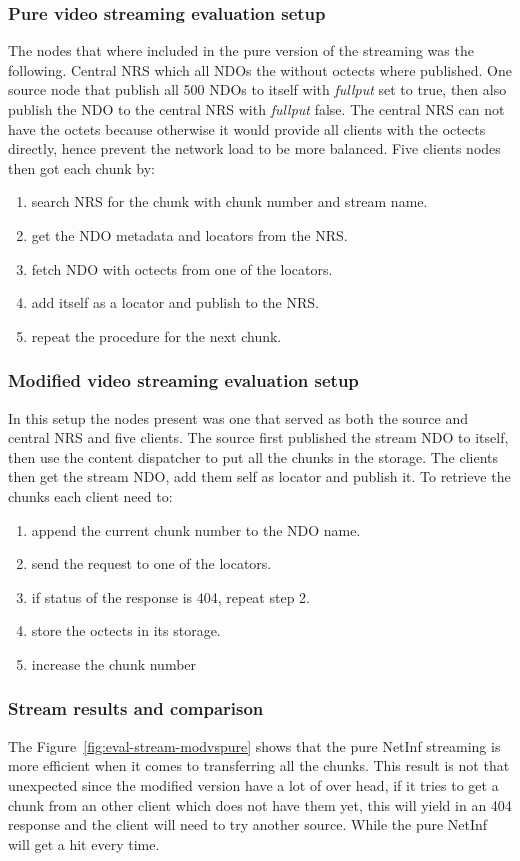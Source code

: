 \subsubsection{Pure video streaming evaluation setup}
The nodes that where included in the pure version of the streaming was the following. 
Central NRS which all NDOs the without octects where published. 
One source node that publish all 500 NDOs to itself with \textit{fullput} set to true, then also publish the NDO to the central NRS with \textit{fullput} false. The central NRS can not have the octets because otherwise it would provide all clients with the octects directly, hence prevent the network load to be more balanced.
Five clients nodes then got each chunk by:
\begin{enumerate}
\item search NRS for the chunk with chunk number and stream name.
\item get the NDO metadata and locators from the NRS.
\item fetch NDO with octects from one of the locators.
\item add itself as a locator and publish to the NRS.
\item repeat the procedure for the next chunk.
\end{enumerate}

\subsubsection{Modified video streaming evaluation setup}
In this setup the nodes present was one that served as both the source and central NRS and five clients. The source first published the stream NDO to itself, then use the content dispatcher to put all the chunks in the storage.
The clients then get the stream NDO, add them self as locator and publish it. To retrieve the chunks each client need to:
\begin{enumerate}
\item append the current chunk number to the NDO name.
\item send the request to one of the locators.
\item if status of the response is 404, repeat step 2.
\item store the octects in its storage.
\item increase the chunk number
\end{enumerate}

\subsubsection{Stream results and comparison} 
The Figure~\ref{fig:eval-stream-modvspure} shows that the pure NetInf streaming is more efficient when it comes to transferring all the chunks. This result is not that unexpected since the modified version have a lot of over head, if it tries to get a chunk from an other client which does not have them yet, this will yield in an 404 response and the client will need to try another source. While the pure NetInf will get a hit every time. 
 
